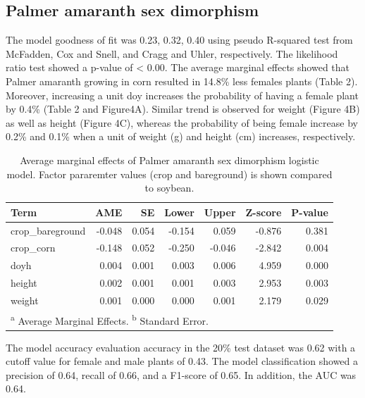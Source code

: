 \documentclass[utf8]{frontiersSCNS}
\begin{document}
\hypertarget{palmer-amaranth-sex-dimorphism}{%
\subsection*{Palmer amaranth sex
dimorphism}\label{palmer-amaranth-sex-dimorphism}}

The model goodness of fit was 0.23, 0.32, 0.40 using pseudo R-squared
test from McFadden, Cox and Snell, and Cragg and Uhler, respectively.
The likelihood ratio test showed a p-value of \textless{} 0.00. The
average marginal effects showed that Palmer amaranth growing in corn
resulted in 14.8\% less females plants (Table 2). Moreover, increasing a
unit doy increases the probability of having a female plant by 0.4\%
(Table 2 and Figure4A). Similar trend is observed for weight (Figure 4B)
as well as height (Figure 4C), whereas the probability of being female
increase by 0.2\% and 0.1\% when a unit of weight (g) and height (cm)
increases, respectively.

\begin{table}[!h]

\caption{\label{tab:unnamed-chunk-3}Average marginal effects of Palmer amaranth sex dimorphism logistic model. Factor pararemter values (crop and bareground) is shown compared to soybean.}
\centering
\fontsize{10}{12}\selectfont
\begin{tabular}[t]{lrrrrrr}
\toprule
Term & AME & SE & Lower & Upper & Z-score & P-value\\
\midrule
crop\_bareground & -0.048 & 0.054 & -0.154 & 0.059 & -0.876 & 0.381\\

crop\_corn & -0.148 & 0.052 & -0.250 & -0.046 & -2.842 & 0.004\\

doyh & 0.004 & 0.001 & 0.003 & 0.006 & 4.959 & 0.000\\

height & 0.002 & 0.001 & 0.001 & 0.003 & 2.953 & 0.003\\

weight & 0.001 & 0.000 & 0.000 & 0.001 & 2.179 & 0.029\\
\bottomrule
\multicolumn{7}{l}{\rule{0pt}{1em}\textsuperscript{a} Average Marginal Effects. \textsuperscript{b} Standard Error.}\\
\end{tabular}
\end{table}

The model accuracy evaluation accuracy in the 20\% test dataset was 0.62
with a cutoff value for female and male plants of 0.43. The model
classification showed a precision of 0.64, recall of 0.66, and a
F1-score of 0.65. In addition, the AUC was 0.64.
\end{document}
